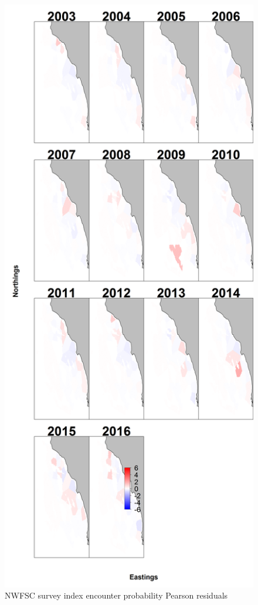 \documentclass[12pt,]{article}
\begin{document}
\begin{figure}[htbp]
\centering
\includegraphics{Figures/Fleet8_encounter_pearson.png}
\caption{NWFSC survey index encounter probability Pearson residuals
\label{fig:Fleet8_encounter_pearson}}
\end{figure}
\end{document}
